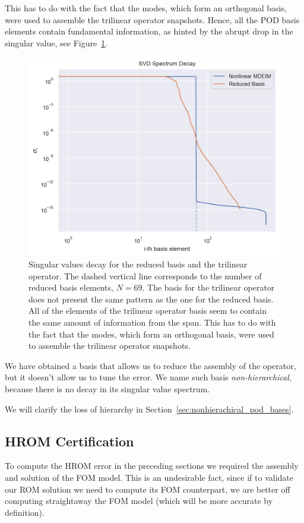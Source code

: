 \documentclass[../../thesis.tex]{subfiles}
\begin{document}
This has to do with the fact that the modes,
which form an orthogonal basis, were used to assemble the trilinear operator snapshots.
Hence, all the POD basis elements contain fundamental information,
as hinted by the abrupt drop in the singular value, see Figure~\ref{fig:sigmas_decay}. 
\begin{figure}
    \centering
    \includegraphics[width=1\columnwidth]{research_project/piston/figures/mdeim_certification/sigmas_problem.png}
    \caption{Singular values decay for the reduced basis and the trilinear operator.
    The dashed vertical line corresponds to the number of reduced basis elements, $N=69$.
    The basis for the trilinear operator does not present the same pattern as the 
    one for the reduced basis.
    All of the elements of the trilinear operator basis 
    seem to contain the same amount of information from the span.
    This has to do with the fact that the modes,
    which form an orthogonal basis, were used to assemble the trilinear operator snapshots.}
    \label{fig:sigmas_decay}
\end{figure}
We have obtained a basis that allows us to reduce the assembly of the operator, 
but it doesn't allow us to tune the error.
We name such basis \textit{non-hierarchical}, 
because there is no decay in its singular value spectrum.

We will clarify the loss of hierarchy in Section~\ref{sec:nonhierachical_pod_bases}.

\subsection{HROM Certification}
\label{sec:hrom_results_posteriori_error_estimation}
To compute the HROM error in the preceding sections
we required the assembly and solution of the FOM model.
This is an undesirable fact, since if to validate our ROM solution
we need to compute its FOM counterpart, 
we are better off computing straightaway the FOM model 
(which will be more accurate by definition).
\end{document}
